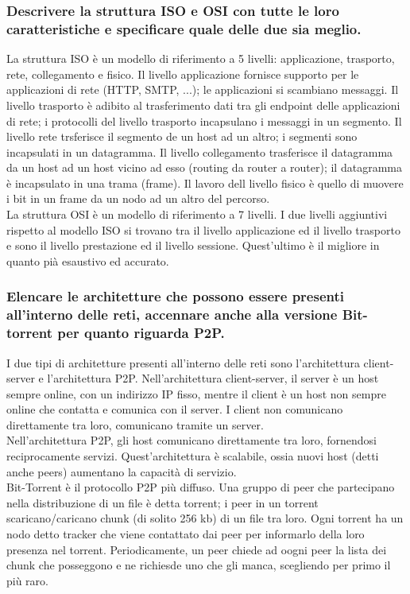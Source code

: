 \documentclass[11pt]{article}
\begin{document}
\subsubsection*{Descrivere la struttura ISO e OSI con tutte le loro caratteristiche e specificare quale delle due sia meglio.}
La struttura ISO è un modello di riferimento a 5 livelli: applicazione, trasporto, rete, collegamento e fisico.
Il livello applicazione fornisce supporto per le applicazioni di rete (HTTP, SMTP, ...); le applicazioni si scambiano messaggi. 
Il livello trasporto è adibito al trasferimento dati tra gli endpoint delle applicazioni di rete; i protocolli del livello 
trasporto incapsulano i messaggi in un segmento. Il livello rete trsferisce il segmento de un host ad un altro; i segmenti 
sono incapsulati in un datagramma. Il livello collegamento trasferisce il datagramma da un host ad un host vicino ad esso 
(routing da router a router); il datagramma è incapsulato in una trama (frame). Il lavoro dell livello fisico è quello di 
muovere i bit in un frame da un nodo ad un altro del percorso.\\
La struttura OSI è un modello di riferimento a 7 livelli. I due livelli aggiuntivi rispetto al modello ISO si trovano tra 
il livello applicazione ed il livello trasporto e sono il livello prestazione ed il livello sessione. Quest'ultimo è il 
migliore in quanto pià esaustivo ed accurato.
\subsubsection*{Elencare le architetture che possono essere presenti all'interno delle reti, accennare anche alla versione Bit-torrent per quanto riguarda P2P.}
I due tipi di architetture presenti all'interno delle reti sono l'architettura client-server e l'architettura P2P.
Nell'architettura client-server, il server è un host sempre online, con un indirizzo IP fisso, mentre il client è un host 
non sempre online che contatta e comunica con il server. I client non comunicano direttamente tra loro, comunicano tramite 
un server.\\
Nell'architettura P2P, gli host comunicano direttamente tra loro, fornendosi reciprocamente servizi. Quest'architettura 
è scalabile, ossia nuovi host (detti anche peers) aumentano la capacità di servizio.\\
Bit-Torrent è il protocollo P2P più diffuso. Una gruppo di peer che partecipano nella distribuzione di un file è detta 
torrent; i peer in un torrent scaricano/caricano chunk (di solito 256 kb) di un file tra loro. Ogni torrent ha un nodo 
detto tracker che viene contattato dai peer per informarlo della loro presenza nel torrent. Periodicamente, un peer chiede 
ad oogni peer la lista dei chunk che posseggono e ne richiesde uno che gli manca, scegliendo per primo il più raro.
\end{document}
